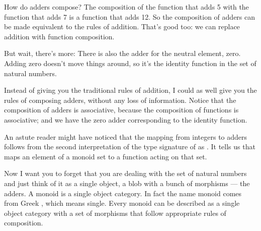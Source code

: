 How do adders compose? The composition of the function that adds 5 with
the function that adds 7 is a function that adds 12. So the composition
of adders can be made equivalent to the rules of addition. That's good
too: we can replace addition with function composition.

But wait, there's more: There is also the adder for the neutral element,
zero. Adding zero doesn't move things around, so it's the identity
function in the set of natural numbers.

Instead of giving you the traditional rules of addition, I could as well
give you the rules of composing adders, without any loss of information.
Notice that the composition of adders is associative, because the
composition of functions is associative; and we have the zero adder
corresponding to the identity function.

An astute reader might have noticed that the mapping from integers to
adders follows from the second interpretation of the type signature of
 as . It
tells us that  maps an element of a monoid set to a
function acting on that set.

Now I want you to forget that you are dealing with the set of natural
numbers and just think of it as a single object, a blob with a bunch of
morphisms --- the adders. A monoid is a single object category. In fact
the name monoid comes from Greek , which means single. Every
monoid can be described as a single object category with a set of
morphisms that follow appropriate rules of composition.


\begin{figure}
\centering
{}
\end{figure}


